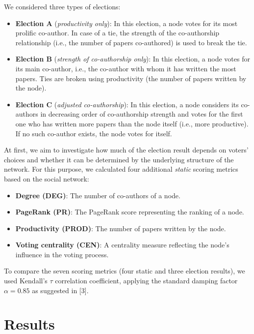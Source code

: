 \documentclass{article} %
\begin{document}
We considered three types of elections:

\begin{itemize}
    \item \textbf{Election A} (\textit{productivity only}): In this election, a node votes for its most prolific co-author. In case of a tie, the strength of the co-authorship relationship (i.e., the number of papers co-authored) is used to break the tie.
    
    \item \textbf{Election B} (\textit{strength of co-authorship only}): In this election, a node votes for its main co-author, i.e., the co-author with whom it has written the most papers. Ties are broken using productivity (the number of papers written by the node).
    
    \item \textbf{Election C} (\textit{adjusted co-authorship}): In this election, a node considers its co-authors in decreasing order of co-authorship strength and votes for the first one who has written more papers than the node itself (i.e., more productive). If no such co-author exists, the node votes for itself.
\end{itemize}

At first, we aim to investigate how much of the election result depends on voters' choices and whether it can be determined by the underlying structure of the network. For this purpose, we calculated four additional \textit{static} scoring metrics based on the social network:

\begin{itemize}
    \item \textbf{Degree (DEG)}: The number of co-authors of a node.
    \item \textbf{PageRank (PR)}: The PageRank score representing the ranking of a node.
    \item \textbf{Productivity (PROD)}: The number of papers written by the node.
    \item \textbf{Voting centrality (CEN)}: A centrality measure reflecting the node's influence in the voting process.
\end{itemize}

To compare the seven scoring metrics (four static and three election results), we used Kendall’s \(\tau\) correlation coefficient, applying the standard damping factor \( \alpha = 0.85 \) as suggested in [3].

\section{Results}
\end{document}
